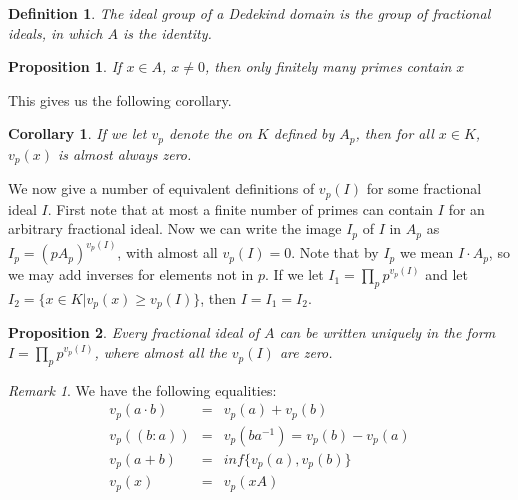 \documentclass[11pt]{article} %
\newtheorem{defn}{Definition}
\newtheorem{cor}{Corollary}
\newtheorem{prop}{Proposition}
\theoremstyle{remark}\newtheorem*{rem}{Remark}
\begin{document}
 \begin{defn}
  The ideal group of a Dedekind domain is the group of fractional ideals, in which $A$ is the identity.
 \end{defn}
 
 \begin{prop}
  If $x\in A$, $x\neq 0$, then only finitely many primes contain $x$
 \end{prop}

 This gives us the following corollary.
 \begin{cor}
  If we let $v_p$ denote the on $K$ defined by $A_p$, then for all $x\in K$, $v_p(x)$ is almost always zero.
 \end{cor}
 
We now give a number of equivalent definitions of $v_p(I)$ for some fractional ideal $I$.
First note that at most a finite number of primes can contain $I$ for an arbitrary fractional ideal.
Now we can write the image $I_p$ of $I$ in $A_p$ as $I_p = (pA_p)^{v_p(I)}$, with almost all $v_p(I)=0$.
Note that by $I_p$ we mean $I\cdot A_p$, so we may add inverses for elements not in $p$.
If we let $I_1=\prod_p p^{v_p(I)}$ and let $I_2 = \{x\in K | v_p(x)\geq v_p(I)\}$, then $I=I_1=I_2$.

\begin{prop}
 Every fractional ideal of $A$ can be written uniquely in the form $I=\prod_p p^{v_p(I)}$, where almost all the $v_p(I)$ are zero.
\end{prop}

\begin{rem}
 We have the following equalities:
 \begin{eqnarray*}
  v_p(a\cdot b) & = & v_p(a) + v_p(b)\\
  v_p((b:a)) &= &v_p(ba^{-1}) = v_p(b) - v_p(a)\\
  v_p(a+b) & = & inf\{v_p(a),v_p(b)\}\\
  v_p(x) & = & v_p(xA)
 \end{eqnarray*}
\end{rem}
\end{document}
